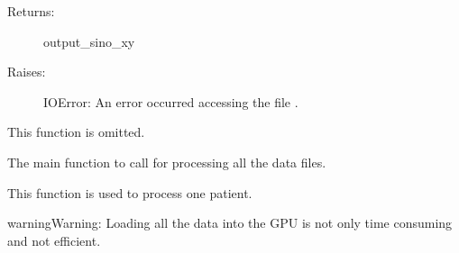 \documentclass[letterpaper,10pt,english]{sphinxmanual}
\begin{document}
\begin{fulllineitems}
\begin{fulllineitems}
\begin{description}
\item[{Returns:}] \leavevmode
output\_sino\_xy

\item[{Raises:}] \leavevmode
IOError: An error occurred accessing the file .

\end{description}

\end{fulllineitems}


\begin{fulllineitems}
\label{\detokenize{usage/tof_file:sino_process_tof.Sinogram_Processor.remove_block}}
This function is omitted.

\end{fulllineitems}


\end{fulllineitems}


\begin{fulllineitems}
\label{\detokenize{usage/tof_file:sino_process_tof.main}}
The main function to call for processing all the data files.

\end{fulllineitems}


\begin{fulllineitems}
\label{\detokenize{usage/tof_file:sino_process_tof.process_sinogram}}
This function is used to process one patient.

\end{fulllineitems}


\begin{sphinxadmonition}{warning}{Warning:}
Loading all the data into the GPU is not only time consuming and not efficient.
\end{sphinxadmonition}
\end{document}

